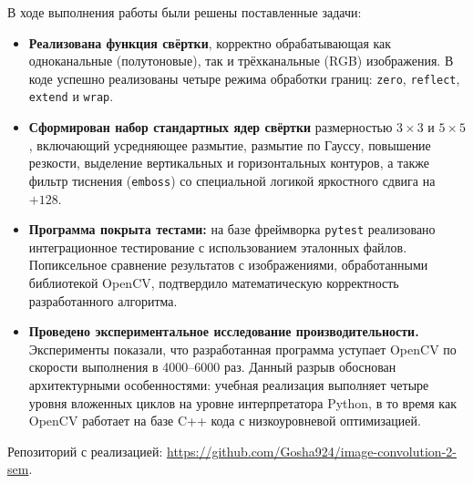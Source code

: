 \documentclass[a4paper]{article}
\begin{document}
В ходе выполнения работы были решены поставленные задачи:
\begin{itemize}
    \item \textbf{Реализована функция свёртки}, корректно обрабатывающая как одноканальные (полутоновые), так и трёхканальные (RGB) изображения. В коде успешно реализованы четыре режима обработки границ: \verb|zero|, \verb|reflect|, \verb|extend| и \verb|wrap|.
    \item \textbf{Сформирован набор стандартных ядер свёртки} размерностью $3 \times 3$ и $5 \times 5$, включающий усредняющее размытие, размытие по Гауссу, повышение резкости, выделение вертикальных и горизонтальных контуров, а также фильтр тиснения (\texttt{emboss}) со специальной логикой яркостного сдвига на $+128$.
    \item \textbf{Программа покрыта тестами:} на базе фреймворка \texttt{pytest} реализовано интеграционное тестирование с использованием эталонных файлов. Попиксельное сравнение результатов с изображениями, обработанными библиотекой OpenCV, подтвердило математическую корректность разработанного алгоритма.
    \item \textbf{Проведено экспериментальное исследование производительности.} Эксперименты показали, что разработанная программа уступает OpenCV по скорости выполнения в 4000--6000 раз. Данный разрыв обоснован архитектурными особенностями: учебная реализация выполняет четыре уровня вложенных циклов на уровне интерпретатора Python, в то время как OpenCV работает на базе C++ кода с низкоуровневой оптимизацией.
\end{itemize}

Репозиторий с реализацией: \url{https://github.com/Gosha924/image-convolution-2-sem}.
\end{document}
